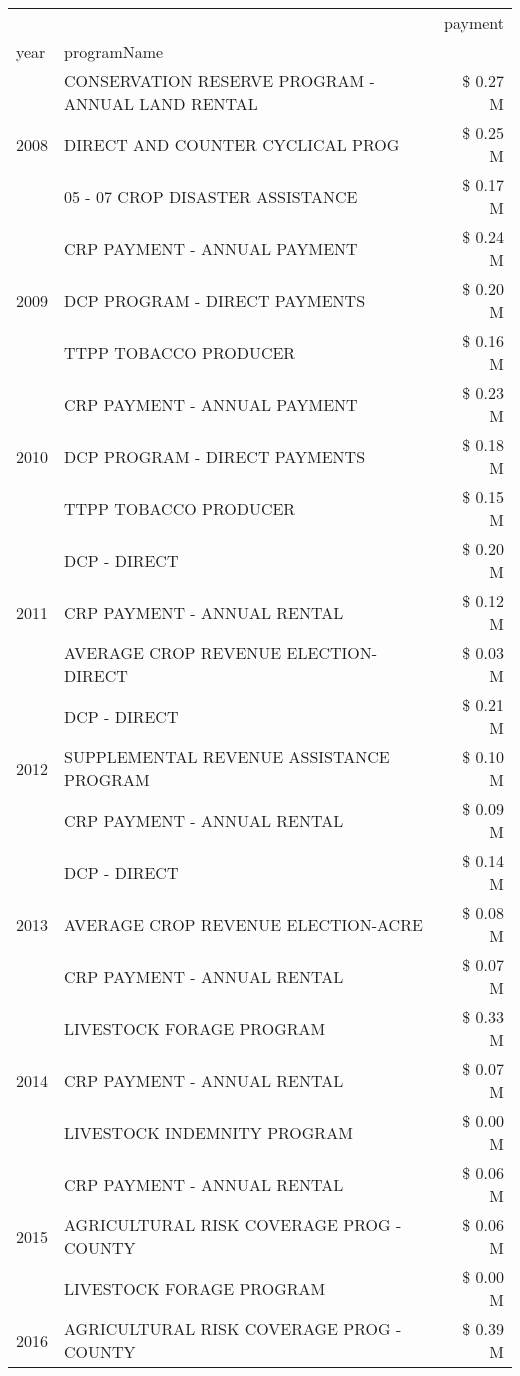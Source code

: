\begin{tabular}{llr}
\toprule
 &  & payment \\
year & programName &  \\
\midrule
\multirow[t]{3}{*}{2008} & CONSERVATION RESERVE PROGRAM - ANNUAL LAND RENTAL & \$ 0.27 M \\
 & DIRECT AND COUNTER CYCLICAL PROG & \$ 0.25 M \\
 & 05 - 07 CROP DISASTER ASSISTANCE & \$ 0.17 M \\
\cline{1-3}
\multirow[t]{3}{*}{2009} & CRP PAYMENT - ANNUAL PAYMENT & \$ 0.24 M \\
 & DCP PROGRAM - DIRECT PAYMENTS & \$ 0.20 M \\
 & TTPP TOBACCO PRODUCER & \$ 0.16 M \\
\cline{1-3}
\multirow[t]{3}{*}{2010} & CRP PAYMENT - ANNUAL PAYMENT & \$ 0.23 M \\
 & DCP PROGRAM - DIRECT PAYMENTS & \$ 0.18 M \\
 & TTPP TOBACCO PRODUCER & \$ 0.15 M \\
\cline{1-3}
\multirow[t]{3}{*}{2011} & DCP - DIRECT & \$ 0.20 M \\
 & CRP PAYMENT - ANNUAL RENTAL & \$ 0.12 M \\
 & AVERAGE CROP REVENUE ELECTION-DIRECT & \$ 0.03 M \\
\cline{1-3}
\multirow[t]{3}{*}{2012} & DCP - DIRECT & \$ 0.21 M \\
 & SUPPLEMENTAL REVENUE ASSISTANCE PROGRAM & \$ 0.10 M \\
 & CRP PAYMENT - ANNUAL RENTAL & \$ 0.09 M \\
\cline{1-3}
\multirow[t]{3}{*}{2013} & DCP - DIRECT & \$ 0.14 M \\
 & AVERAGE CROP REVENUE ELECTION-ACRE & \$ 0.08 M \\
 & CRP PAYMENT - ANNUAL RENTAL & \$ 0.07 M \\
\cline{1-3}
\multirow[t]{3}{*}{2014} & LIVESTOCK FORAGE PROGRAM & \$ 0.33 M \\
 & CRP PAYMENT - ANNUAL RENTAL & \$ 0.07 M \\
 & LIVESTOCK INDEMNITY PROGRAM & \$ 0.00 M \\
\cline{1-3}
\multirow[t]{3}{*}{2015} & CRP PAYMENT - ANNUAL RENTAL & \$ 0.06 M \\
 & AGRICULTURAL RISK COVERAGE PROG - COUNTY & \$ 0.06 M \\
 & LIVESTOCK FORAGE PROGRAM & \$ 0.00 M \\
\cline{1-3}
\multirow[t]{3}{*}{2016} & AGRICULTURAL RISK COVERAGE PROG - COUNTY & \$ 0.39 M \\

\end{tabular}
